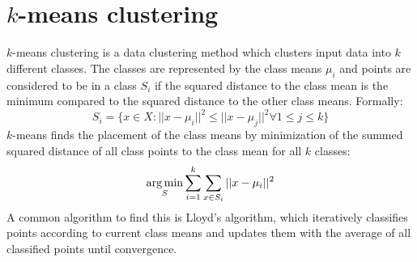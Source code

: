 \documentclass{article}
\begin{document}
\section{$k$-means clustering}
$k$-means clustering is a data clustering method which clusters input data into $k$ different classes.
The classes are represented by the class means $\mu_i$ and points are considered to be in a class $S_i$
if the squared distance to the class mean is the minimum
compared to the squared distance to the other class means.
Formally:
\[
  S_i = \{ x \in X : ||x - \mu_i||^2 \leq ||x - \mu_j||^2 \forall 1 \leq j \leq k \}
\]
$k$-means finds the placement of the class means
by minimization of the summed squared distance of all class points to the class mean for all $k$ classes:
\[
  \operatorname*{arg\,min}_S \sum_{i=1}^k \sum_{x \in S_i} ||x - \mu_i||^2
\]
A common algorithm to find this is Lloyd's algorithm,
which iteratively classifies points according to current class means
and updates them with the average of all classified points until convergence.
\end{document}
